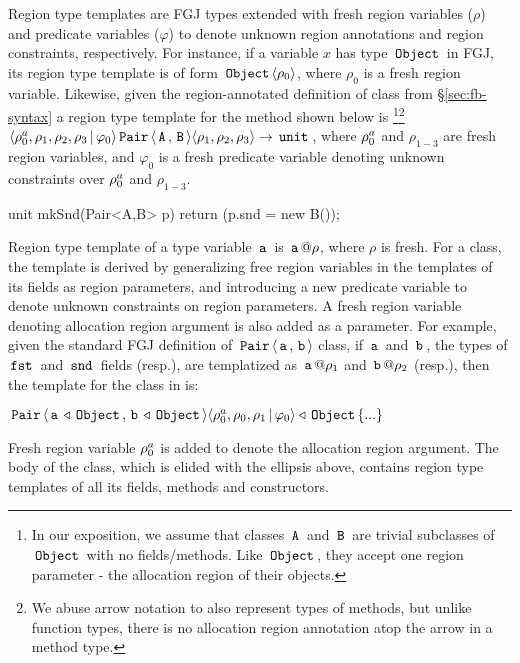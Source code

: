 Region type templates are FGJ types extended with fresh region
variables ($\rho$) and predicate variables ($\varphi$) to denote
unknown region annotations and region constraints, respectively. For
instance, if a variable $x$ has type $\,{\tt Object}\,$ in FGJ, its region type
template is of form $\,{\tt Object}\,\langle \rho_0 \rangle$, where $\rho_0$ is a fresh
region variable. Likewise, given the region-annotated definition of
 class from \S\ref{sec:fb-syntax} a region type template for
the method  shown below is \footnote{In our
exposition, we assume that classes $\,{\tt A}\,$ and $\,{\tt B}\,$ are trivial
subclasses of $\,{\tt Object}\,$ with no fields/methods. Like $\,{\tt Object}\,$, they
accept one region parameter - the allocation region of their
objects.}\footnote{We abuse arrow notation to also represent types of
methods, but unlike function types, there is no allocation region
annotation atop the arrow in a method type.}
$\langle \rho^a_0,\rho_1,\rho_2,\rho_3 \,|\, \varphi_0 \rangle
\,{\tt Pair}\,\langle \,{\tt A}\,,\,{\tt B}\, \rangle \langle \rho_1,\rho_2,\rho_3 \rangle \rightarrow
\,{\tt unit}\,$, where $\rho^a_0$ and $\rho_{1-3}$ are fresh region
variables, and $\varphi_0$ is a fresh predicate variable denoting
unknown constraints over $\rho^a_0$ and $\rho_{1-3}$.  
\begin{codejava}
  unit mkSnd(Pair<A,B> p) {
    return (p.snd = new B());
  }
\end{codejava}
Region type template of a type variable $\,{\tt a}\,$ is $\,{\tt a}\,@\rho$, where
$\rho$ is fresh. For a class, the template is derived by generalizing
free region variables in the templates of its fields as region
parameters, and introducing a new predicate variable to denote
unknown constraints on region parameters. A fresh region variable
denoting allocation region argument is also added as a parameter. For
example, given the standard FGJ definition of 
$\,{\tt Pair}\,\langle \,{\tt a}\,,\,{\tt b}\, \rangle$ class, if $\,{\tt a}\,$
and $\,{\tt b}\,$, the types of $\,{\tt fst}\,$ and $\,{\tt snd}\,$ fields (resp.), are
templatized as $\,{\tt a}\,@\rho_1$ and $\,{\tt b}\,@\rho_2$ (resp.), then
the template for the class in \FB is:
\begin{center}
$\,{\tt Pair}\,\langle \,{\tt a}\,\triangleleft\,{\tt Object}\,,\,{\tt b}\,\triangleleft\,{\tt Object}\, \rangle
\langle \rho^a_0,\rho_0,\rho_1\,|\,\varphi_0 \rangle \triangleleft \,{\tt Object}\, \{...\}$
\end{center}
Fresh region variable $\rho^a_0$ is added to denote the allocation
region argument. The body of the class, which is elided with the
ellipsis above, contains region type templates of all its fields,
methods and constructors.

